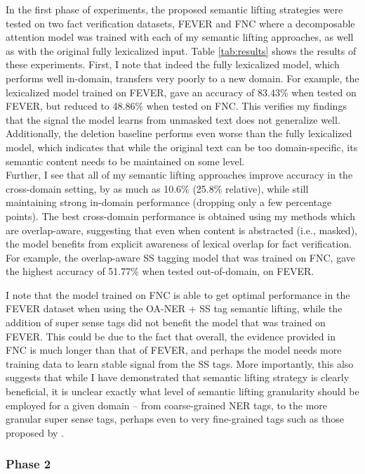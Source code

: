 \documentclass{article}
\begin{document}
In the first phase of experiments, the proposed semantic lifting strategies were tested on two fact verification datasets, FEVER and FNC where a decomposable attention model was trained with each of my semantic lifting approaches, as well as with the original fully lexicalized input.  Table \ref{tab:results} shows the results of these experiments.
First, I note that indeed the fully lexicalized model, which performs well in-domain, transfers very poorly to a new domain.  
For example, the lexicalized model trained on FEVER,  gave an accuracy of 83.43\% when tested on FEVER, but reduced to 48.86\% when tested on FNC.
This verifies my findings that the signal the model learns from unmasked text does not generalize well.
Additionally, the deletion baseline performs even worse than the fully lexicalized model, which indicates that while the original text can be too domain-specific, its semantic content needs to be maintained on some level. \\
Further, I see that all of my semantic lifting approaches improve accuracy in the cross-domain setting, by as much as 10.6\% (25.8\% relative), while still maintaining strong in-domain performance (dropping only a few percentage points).
The best cross-domain performance is obtained using my methods which are overlap-aware, suggesting that even when content is abstracted (i.e., masked), the model benefits from explicit awareness of lexical overlap for fact verification. For example, the overlap-aware SS tagging model that was trained on FNC, gave the highest accuracy of 51.77\% when tested out-of-domain, on FEVER.

I note that the model trained on FNC is able to get optimal performance in the FEVER dataset when using the OA-NER + SS tag semantic lifting, while the addition of super sense tags did not benefit the model that was trained on FEVER.  
This could be due to the fact that overall, the evidence provided in FNC is much longer than that of FEVER,
and perhaps the model needs more training data to learn stable signal from the SS tags. 
More importantly, this also suggests that while I have demonstrated that semantic lifting strategy is clearly beneficial, it is unclear exactly what level of semantic lifting granularity should be employed for a given domain -- from coarse-grained NER tags, to the more granular super sense tags, perhaps even to very fine-grained tags such as those proposed by \citet{ling2012fine}.

\subsubsection {Phase 2}
\end{document}
